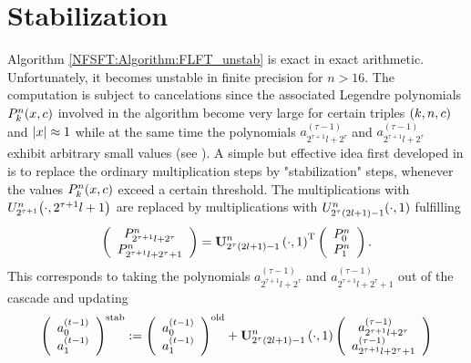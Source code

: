 \section{Stabilization}
\label{DSFT:Stabilization}
Algorithm \ref{NFSFT:Algorithm:FLFT_unstab} is exact in exact arithmetic. Unfortunately, it becomes unstable in finite precision for $n > 16$. The computation is subject to cancelations since the associated Legendre polynomials $P_{k}^n{\hspace{-0.4ex}}\left(x,c\right)$ involved in the algorithm become very large for certain triples $\left(k,n,c\right)$ and $\left\vert x\right\vert \approx 1$ while at the same time the polynomials $a_{2^{\tau+1}l+2^{\tau}}^{(\tau-1)}$ and $a_{2^{\tau+1}l+2^{\tau}}^{(\tau-1)}$ exhibit arbitrary small values (see \cite{kupo02}). A simple but effective idea first developed in \cite{postta97} is to replace the ordinary multiplication steps by "stabilization" steps, whenever the values $P_{k}^n{\hspace{-0.4ex}}\left(x,c\right)$ exceed a certain threshold. The multiplications with $U_{2^{\tau+1}}^n{\hspace{-0.4ex}}\left(\cdot,2^{\tau+1}l+1\right)$ are replaced by multiplications with $U_{2^{\tau}(2l+1)-1}^n{\hspace{-0.4ex}}\left(\cdot,1\right)$ fulfilling
\[
	\left(\begin{array}{c}
	  P_{2^{\tau+1}l+2^{\tau}}^{n}\\ 
	  P_{2^{\tau+1}l+2^{\tau}+1}^{n}
	\end{array}\right)
	=
	\mathbf{U}_{2^{\tau}(2l+1)-1}^{n}\left(\cdot,1\right)^{\text{\rm{T}}}
		\left(\begin{array}{c}
	  P_{0}^{n}\\
	  P_{1}^{n}
	\end{array}\right).
\]
This corresponds to taking the polynomials $a_{2^{\tau+1}l+2^{\tau}}^{(\tau-1)}$ and $a_{2^{\tau+1}l+2^{\tau}+1}^{(\tau-1)}$ out of the cascade and updating
\begin{equation}
  \label{NFSFT:StabilizationStep}
	\left(\begin{array}{c}
	  a_{0}^{(t-1)}\\
	  a_{1}^{(t-1)}
	\end{array}\right)^{\text{stab}}
	:=
	\left(\begin{array}{c}
	  a_{0}^{(t-1)}\\
	  a_{1}^{(t-1)}
	\end{array}\right)^{\text{old}}
  +
	\mathbf{U}_{2^{\tau}(2l+1)-1}^{n}\left(\cdot,1\right)
	\left(\begin{array}{c}
	  a_{2^{\tau+1}l+2^{\tau}}^{(\tau-1)}\\
	  a_{2^{\tau+1}l+2^{\tau}+1}^{(\tau-1)}
	\end{array}\right)  
\end{equation}
